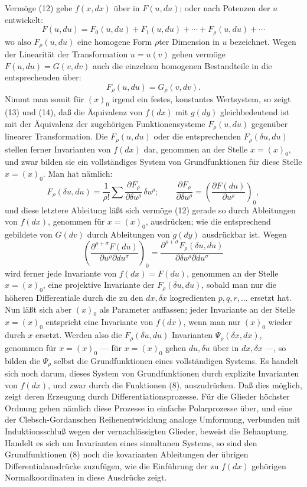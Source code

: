 \documentclass[11pt]{article}
\begin{document}
Vermöge (12) gehe \(f(x,dx)\) über in \(F(u,du)\); oder nach Potenzen
der \(u\) entwickelt:
\begin{equation}
F(u,du)=F_0(u,du)+F_1(u,du)+\cdots+F_\rho(u,du)+\cdots
\tag{13}
\end{equation}
wo also \(F_\rho(u,du)\) eine homogene Form \(\rho\)ter Dimension in
\(u\) bezeichnet. Wegen der Linearität der Transformation \(u=u(v)\)
gehen vermöge \(F(u,du)=G(v,dv)\) auch die einzelnen homogenen
Bestandteile in die entsprechenden über:
\begin{equation}
F_\rho(u,du)=G_\rho(v,dv).
\tag{14}
\end{equation}
Nimmt man somit für \((x)_0\) irgend ein festes, konstantes
Wertsystem, so zeigt (13) und (14), daß die Äquivalenz von \(f(dx)\)
mit \(g(dy)\) gleichbedeutend ist mit der Äquivalenz der zugehörigen
Funktionensysteme \(F_\rho(u,du)\) gegenüber linearer Transformation.
Die \(F_\rho(u,du)\) oder die entsprechenden \(F_\rho(\delta u,du)\)
stellen ferner Invarianten von \(f(dx)\) dar, genommen an der Stelle
\(x=(x)_0\), und zwar bilden sie ein vollständiges System von
Grundfunktionen für diese Stelle \(x=(x)_0\). Man hat nämlich:
\[
F_\rho(\delta u,du)=\frac1{\rho!}\sum
\frac{\partial F_\rho}{\partial \delta u^\rho}\,\delta u^\rho;
\qquad
\frac{\partial F_\rho}{\partial \delta u^\rho}
=\left(\frac{\partial F(du)}{\partial u^\rho}\right)_0,
\]
und diese letztere Ableitung läßt sich vermöge (12) gerade so durch
Ableitungen von \(f(dx)\), genommen für \(x=(x)_0\), ausdrücken; wie
die entsprechend gebildete von \(G(dv)\) durch Ableitungen von \(g(dy)\)
ausdrückbar ist. Wegen
\[
\left(\frac{\partial^{\rho+\sigma}F(du)}
{\partial u^\rho\partial du^\sigma}\right)_0
=
\frac{\partial^{\rho+\sigma}F_\rho(\delta u,du)}
{\partial\delta u^\rho\partial du^\sigma}
\]
wird ferner jede Invariante von \(f(dx)=F(du)\), genommen an der Stelle
\(x=(x)_0\), eine projektive Invariante der \(F_\rho(\delta u,du)\),
sobald man nur die höheren Differentiale durch die zu den \(dx,\delta x\)
kogredienten \(p,q,r,\ldots\) ersetzt hat. Nun läßt sich aber \((x)_0\)
als Parameter auffassen; jeder Invariante an der Stelle \(x=(x)_0\)
entspricht eine Invariante von \(f(dx)\), wenn man nur \((x)_0\) wieder
durch \(x\) ersetzt. Werden also die \(F_\rho(\delta u,du)\) Invarianten
\(\Psi_\rho(\delta x,dx)\), genommen für \(x=(x)_0\) --- für \(x=(x)_0\)
gehen \(du,\delta u\) über in \(dx,\delta x\) ---, so bilden die
\(\Psi_\rho\) selbst die Grundfunktionen eines vollständigen Systems.
Es handelt sich noch darum, dieses System von Grundfunktionen durch
explizite Invarianten von \(f(dx)\), und zwar durch die Funktionen (8),
auszudrücken. Daß dies möglich, zeigt deren Erzeugung durch
Differentiationsprozesse. Für die Glieder höchster Ordnung gehen
nämlich diese Prozesse in einfache Polarprozesse über, und eine der
Clebsch-Gordanschen Reihenentwicklung analoge Umformung, verbunden mit
Induktionsschluß wegen der vernachlässigten Glieder, beweist die
Behauptung. Handelt es sich um Invarianten eines simultanen Systems, so
sind den Grundfunktionen (8) noch die kovarianten Ableitungen der
übrigen Differentialausdrücke zuzufügen, wie die Einführung der zu
\(f(dx)\) gehörigen Normalkoordinaten in diese Ausdrücke zeigt.
\end{document}
